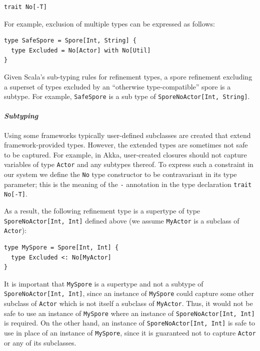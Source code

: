 \documentclass{llncs}
\begin{document}
\begin{lstlisting}[numbers=none]
trait No[-T]
\end{lstlisting}
\noindent


\noindent For example, exclusion of multiple types can be expressed as follows:

\begin{lstlisting}
type SafeSpore = Spore[Int, String] {
  type Excluded = No[Actor] with No[Util]
}
\end{lstlisting}

Given Scala's sub-typing rules for refinement types, a spore refinement
excluding a superset of types excluded by an ``otherwise type-compatible''
spore is a subtype. For example, \verb|SafeSpore| is a sub type of
\verb|SporeNoActor[Int, String]|.

\paragraph{\textbf{\textit{Subtyping}}}

Using some frameworks typically user-defined subclasses are created that extend framework-provided types. However, the extended types are sometimes not safe to be captured. For example, in Akka, user-created closures should not capture variables of type \verb|Actor| and any subtypes thereof. To express such a constraint in our system we define the \verb|No| type constructor to be contravariant in its type parameter; this is the meaning of the \verb|-| annotation in the type declaration \verb|trait No[-T]|.

As a result, the following refinement type is a supertype of type \verb|SporeNoActor[Int, Int]| defined above (we assume \verb|MyActor| is a subclass of \verb|Actor|):

\begin{lstlisting}
type MySpore = Spore[Int, Int] {
  type Excluded <: No[MyActor]
}
\end{lstlisting}
\noindent
It is important that \verb|MySpore| is a supertype and not a subtype of \verb|SporeNoActor[Int, Int]|, since an instance of \verb|MySpore| could capture some other subclass of \verb|Actor| which is not itself a subclass of \verb|MyActor|. Thus, it would not be safe to use an instance of \verb|MySpore| where an instance of \verb|SporeNoActor[Int, Int]| is required. On the other hand, an instance of \verb|SporeNoActor[Int, Int]| is safe to use in place of an instance of \verb|MySpore|, since it is guaranteed not to capture \verb|Actor| or any of its subclasses.
\end{document}
